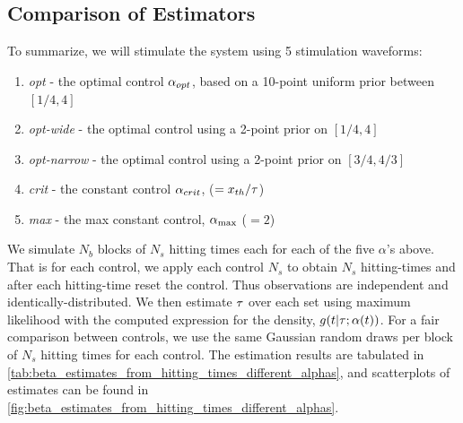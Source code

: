 \documentclass[12pt]{article}
\begin{document}
% 



\subsection{Comparison of Estimators}

To summarize, we will stimulate the system using 5 stimulation
waveforms:  
\begin{enumerate}
  \item {\em opt} - the optimal %
control ${\alpha}_{opt}$, based on
  a 10-point uniform prior between $[1/4, 4]$
  \item  {\em opt-wide} - the optimal control using a 2-point prior on  $[1/4, 4]$
  \item {\em opt-narrow} - the optimal control using a 2-point prior on $[3/4,
  4/3]$
\item   {\em crit} - the constant control
${\alpha}_{crit}$, ($ =  { x_{th} }/{ \tau }$)
\item  {\em max} - the max constant control, ${ {\alpha}_{\textrm{max}} }$ ($=2$)
\end{enumerate} 

We simulate $N_b $ blocks of $N_s$ hitting times each for each of the
five $\alpha$'s above. That is for each control, we apply each control
$N_s$ to obtain $N_s$ hitting-times and after each hitting-time reset the
control. Thus observations are independent and identically-distributed. 
We then estimate ${ \tau }$ over each set using maximum likelihood with the
computed expression for the density, $g(t|{ \tau }; {\alpha}(t) )$. 
For a fair comparison between controls, we use the same Gaussian random draws per block of
$N_s$ hitting times for each control. The estimation results are tabulated in 
\cref{tab:beta_estimates_from_hitting_times_different_alphas}, and
scatterplots of estimates can be found in \cref{fig:beta_estimates_from_hitting_times_different_alphas}.
\end{document}
